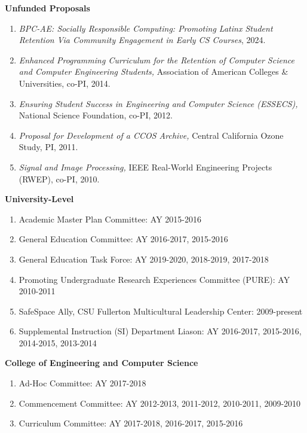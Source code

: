 \documentclass[11pt]{letter}
\begin{document}
\textbf{Unfunded Proposals}
\begin{enumerate}
\item \emph{BPC-AE: Socially Responsible Computing: Promoting Latinx Student Retention Via Community Engagement in Early CS Courses}, 2024.
\item \emph{Enhanced Programming Curriculum for the Retention of Computer Science and Computer Engineering Students,} Association of American Colleges \& Universities, co-PI, 2014.
\item \emph{Ensuring Student Success in Engineering and Computer Science (ESSECS),} National Science Foundation, co-PI, 2012.
\item \emph{Proposal for Development of a CCOS Archive,} Central California Ozone Study, PI, 2011.
\item \emph{Signal and Image Processing,} IEEE Real-World Engineering Projects (RWEP), co-PI, 2010.
\end{enumerate}


\textbf{University-Level}
\begin{enumerate}
\item Academic Master Plan Committee: AY 2015-2016
\item General Education Committee: AY 2016-2017, 2015-2016
\item General Education Task Force: AY 2019-2020, 2018-2019, 2017-2018
\item Promoting Undergraduate Research Experiences Committee (PURE): AY 2010-2011
\item SafeSpace Ally, CSU Fullerton Multicultural Leadership Center: 2009-present
\item Supplemental Instruction (SI) Department Liason: AY 2016-2017, 2015-2016, 2014-2015, 2013-2014
\end{enumerate}

\textbf{College of Engineering and Computer Science}
\begin{enumerate}
\item Ad-Hoc Committee: AY 2017-2018
\item Commencement Committee: AY 2012-2013, 2011-2012, 2010-2011, 2009-2010
\item Curriculum Committee: AY 2017-2018, 2016-2017, 2015-2016
\end{enumerate}
\end{document}
